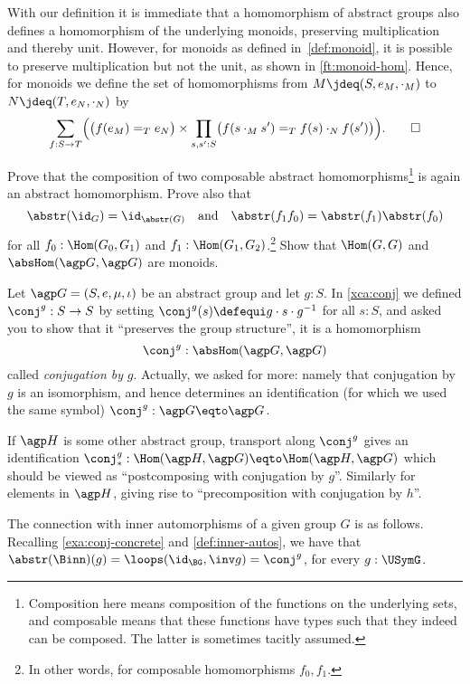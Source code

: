 \begin{remark}\label{rem:monoid-hom}
  With our definition it is immediate that a homomorphism of abstract
  groups also defines a homomorphism of the underlying monoids,
  preserving multiplication and thereby unit. However,
  for monoids as defined in~\cref{def:monoid}, it is possible to preserve
  multiplication but not the unit, as shown in \cref{ft:monoid-hom}.
  Hence, for monoids we define the set of homomorphisms
  from $M \jdeq (S,e_M,\cdot_M)$ to $N \jdeq(T,e_N,\cdot_N)$ by
  \[
    \sum_{f:S\to T}\Bigl(\bigl(f(e_M) =_T e_N\bigr)\times
    \prod_{s,s':S}\bigl(f(s\cdot_M s')=_T f(s)\cdot_N f(s')\bigr)\Bigr).%
    \qedhere
  \]
\end{remark}

\begin{xca}\label{xca:abshomcomposition}
Prove that the composition of two composable abstract homomorphisms\footnote{%
Composition here means composition of the functions on the underlying
sets, and composable means that these functions have types such 
that they indeed can be composed. The latter is sometimes tacitly assumed.}
is again an abstract homomorphism. Prove also that
  $$\abstr(\id_G)=\id_{\abstr(G)} \quad\text{and}\quad
  \abstr(f_1f_0)=\abstr(f_1)\abstr(f_0)$$ 
for all $f_0:\Hom(G_0,G_1)$ and $f_1:\Hom(G_1,G_2)$.\footnote{%
In other words, for composable homomorphisms $f_0,f_1$.}
Show that $\Hom(G,G)$ and $\absHom(\agp G,\agp G)$ are monoids.
\end{xca}

\begin{example}
  \label{ex:conjhom}
  Let $\agp G=(S,e,\mu,\iota)$ be an abstract group and let $g:S$. 
  In \cref{xca:conj} we defined $\conj^g:S\to S$ by setting 
  $\conj^g(s)\defequi g\cdot s\cdot g^{-1}$ for all $s:S$,
  and asked you to show that it ``preserves the group structure'',
  \ie it is a homomorphism
  \[
    \conj^g:\absHom(\agp G,\agp G)
  \]
  called \emph{conjugation by} $g$.
  Actually, we asked for more: namely that conjugation by $g$ is 
  an isomorphism, and hence determines an identification
  (for which we used the same symbol) $\conj^g:\agp G\eqto\agp G$.

  If $\agp H$ is some other abstract group, transport along $\conj^g$
  gives an identification
  $\conj^g_*:\Hom(\agp H,\agp G) \eqto \Hom(\agp H,\agp G)$
  which should be viewed as ``postcomposing with conjugation by $g$''.
  Similarly for elements in $\agp H$,
  giving rise to ``precomposition with conjugation by $h$''.
  
  The connection with inner automorphisms of a given group $G$ is
  as follows. Recalling \cref{exa:conj-concrete} and \cref{def:inner-autos},
  we have that $\abstr(\Binn)(g)=\loops(\id_{\BG},\inv g)=\conj^g$,
  for every $g:\USymG$.
\end{example}

